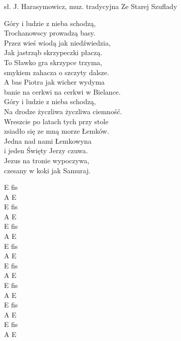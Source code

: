 {sł. J. Harasymowicz, muz. tradycyjna}
{Ze Starej Szuflady}
\begin{text}
Góry i ludzie z nieba schodzą,\\
Trochanowscy prowadzą basy.\\
Przez wieś wiodą jak niedźwiedzia,\\
Jak jastrząb skrzypeczki płaczą.\\

To Sławko gra skrzypce trzyma,\\
smykiem zahacza o szczyty dalsze.\\
A bas Piotra jak wicher wydyma\\
banie na cerkwi na cerkwi w Bielance.\\

Góry i ludzie z nieba schodzą,\\
Na drodze życzliwa życzliwa ciemność.\\
Wreszcie po latach tych przy stole\\
zsiadło się ze mną morze Łemków.\\

Jedna nad nami Łemkowyna\\
i jeden Święty Jerzy czuwa.\\
Jezus na tronie wypoczywa,\\
czesany w koki jak Samuraj.\\
\end{text}
\begin{chord}
E fis\\
A E\\
E fis\\
A E\\

E fis\\
A E\\
E fis\\
A E\\

E fis\\
A E\\
E fis\\
A E\\

E fis\\
A E\\
E fis\\
A E\\
\end{chord}



